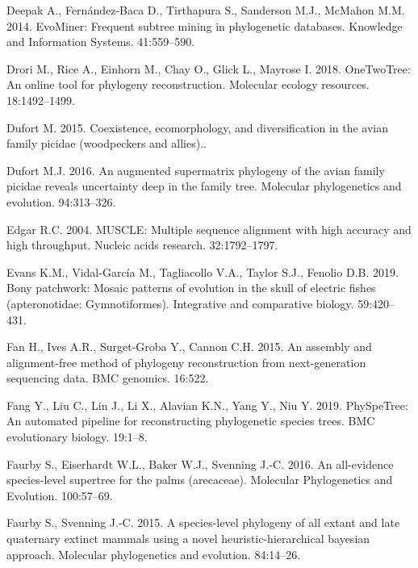 \documentclass[]{article}
\begin{document}
\leavevmode\hypertarget{ref-deepak2014evominer}{}%
Deepak A., Fernández-Baca D., Tirthapura S., Sanderson M.J., McMahon M.M. 2014. EvoMiner: Frequent subtree mining in phylogenetic databases. Knowledge and Information Systems. 41:559--590.

\leavevmode\hypertarget{ref-drori2018onetwotree}{}%
Drori M., Rice A., Einhorn M., Chay O., Glick L., Mayrose I. 2018. OneTwoTree: An online tool for phylogeny reconstruction. Molecular ecology resources. 18:1492--1499.

\leavevmode\hypertarget{ref-dufort2015coexistence}{}%
Dufort M. 2015. Coexistence, ecomorphology, and diversification in the avian family picidae (woodpeckers and allies)..

\leavevmode\hypertarget{ref-dufort2016augmented}{}%
Dufort M.J. 2016. An augmented supermatrix phylogeny of the avian family picidae reveals uncertainty deep in the family tree. Molecular phylogenetics and evolution. 94:313--326.

\leavevmode\hypertarget{ref-edgar2004muscle}{}%
Edgar R.C. 2004. MUSCLE: Multiple sequence alignment with high accuracy and high throughput. Nucleic acids research. 32:1792--1797.

\leavevmode\hypertarget{ref-evans2019bony}{}%
Evans K.M., Vidal-García M., Tagliacollo V.A., Taylor S.J., Fenolio D.B. 2019. Bony patchwork: Mosaic patterns of evolution in the skull of electric fishes (apteronotidae: Gymnotiformes). Integrative and comparative biology. 59:420--431.

\leavevmode\hypertarget{ref-fan2015assembly}{}%
Fan H., Ives A.R., Surget-Groba Y., Cannon C.H. 2015. An assembly and alignment-free method of phylogeny reconstruction from next-generation sequencing data. BMC genomics. 16:522.

\leavevmode\hypertarget{ref-fang2019physpetree}{}%
Fang Y., Liu C., Lin J., Li X., Alavian K.N., Yang Y., Niu Y. 2019. PhySpeTree: An automated pipeline for reconstructing phylogenetic species trees. BMC evolutionary biology. 19:1--8.

\leavevmode\hypertarget{ref-faurby2016all}{}%
Faurby S., Eiserhardt W.L., Baker W.J., Svenning J.-C. 2016. An all-evidence species-level supertree for the palms (arecaceae). Molecular Phylogenetics and Evolution. 100:57--69.

\leavevmode\hypertarget{ref-faurby2015species}{}%
Faurby S., Svenning J.-C. 2015. A species-level phylogeny of all extant and late quaternary extinct mammals using a novel heuristic-hierarchical bayesian approach. Molecular phylogenetics and evolution. 84:14--26.
\end{document}
